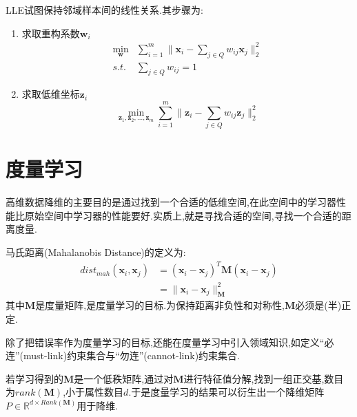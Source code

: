LLE试图保持邻域样本间的线性关系.其步骤为:
\begin{enumerate}
\item 求取重构系数$\mathbf{w}_i$
\begin{equation}\begin{split}
\min_{\mathbf{w}}&\sum_{i=1}^m\|\mathbf{x}_i-\sum_{j\in Q}w_{ij}\mathbf{x}_j\|^2_2\\
s.t.& \sum_{j\in Q}w_{ij}=1
\end{split}\end{equation}
\item 求取低维坐标$\mathbf{z}_i$
\begin{equation}
\min_{\mathbf{z}_1, \mathbf{z}_2, \dots, \mathbf{z}_m}\sum_{i=1}^m\|\mathbf{z}_i-\sum_{j\in Q}w_{ij}\mathbf{z}_j\|_2^2
\end{equation}
\end{enumerate}

\section{度量学习}

高维数据降维的主要目的是通过找到一个合适的低维空间,在此空间中的学习器性能比原始空间中学习器的性能要好.实质上,就是寻找合适的空间,寻找一个合适的距离度量.

马氏距离(Mahalanobis Distance)的定义为:
\begin{equation}\begin{split}
dist_{mah}(\mathbf{x}_i, \mathbf{x}_j)&=(\mathbf{x}_i -\mathbf{x}_j)^T\mathbf{M}(\mathbf{x}_i -\mathbf{x}_j)\\&=\|\mathbf{x}_i -\mathbf{x}_j\|_{\mathbf{M}}^2
\end{split}\end{equation}
其中$\mathbf{M}$是度量矩阵,是度量学习的目标.为保持距离非负性和对称性,$\mathbf{M}$必须是(半)正定.

除了把错误率作为度量学习的目标,还能在度量学习中引入领域知识,如定义``必连''(must-link)约束集合与``勿连''(cannot-link)约束集合.

若学习得到的$\mathbf{M}$是一个低秩矩阵,通过对$\mathbf{M}$进行特征值分解,找到一组正交基,数目为$rank(\mathbf{M})$,小于属性数目$d$.于是度量学习的结果可以衍生出一个降维矩阵$P\in\mathbb{R}^{d\times Rank(\mathbf{M})}$用于降维.